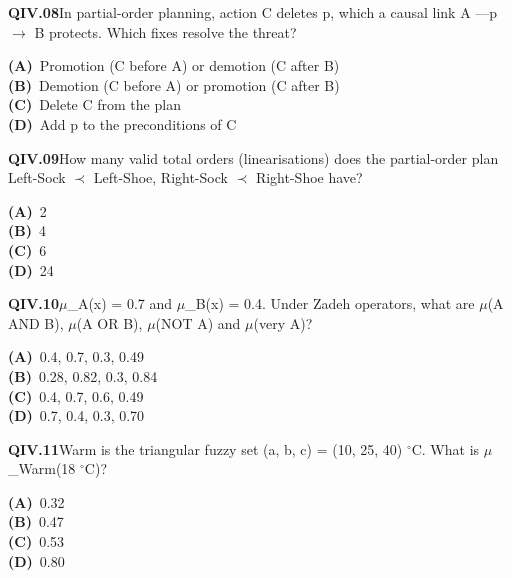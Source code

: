 \documentclass[11pt]{article}
\begin{document}
\begin{tcolorbox}[enhanced,breakable,colback=white,colframe=navyL,arc=2mm,boxrule=0.7pt,left=3mm,right=3mm,top=2mm,bottom=2mm]
\textbf{\color{navy}QIV.08}\quad In partial-order planning, action C deletes p, which a causal link A ---p$\to$ B protects. Which fixes resolve the threat?\hfill{}\par\smallskip
{\small \textbf{\color{navyL}(A)}\ Promotion (C before A) or demotion (C after B)\\[1pt]\textbf{\color{navyL}(B)}\ Demotion (C before A) or promotion (C after B)\\[1pt]\textbf{\color{navyL}(C)}\ Delete C from the plan\\[1pt]\textbf{\color{navyL}(D)}\ Add p to the preconditions of C}
\end{tcolorbox}
\begin{tcolorbox}[enhanced,breakable,colback=white,colframe=navyL,arc=2mm,boxrule=0.7pt,left=3mm,right=3mm,top=2mm,bottom=2mm]
\textbf{\color{navy}QIV.09}\quad How many valid total orders (linearisations) does the partial-order plan Left-Sock $\prec$ Left-Shoe, Right-Sock $\prec$ Right-Shoe have?\hfill{}\par\smallskip
{\small \textbf{\color{navyL}(A)}\ 2\\[1pt]\textbf{\color{navyL}(B)}\ 4\\[1pt]\textbf{\color{navyL}(C)}\ 6\\[1pt]\textbf{\color{navyL}(D)}\ 24}
\end{tcolorbox}
\begin{tcolorbox}[enhanced,breakable,colback=white,colframe=navyL,arc=2mm,boxrule=0.7pt,left=3mm,right=3mm,top=2mm,bottom=2mm]
\textbf{\color{navy}QIV.10}\quad $\mu$\_A(x) = 0.7 and $\mu$\_B(x) = 0.4. Under Zadeh operators, what are $\mu$(A AND B), $\mu$(A OR B), $\mu$(NOT A) and $\mu$(very A)?\hfill{}\par\smallskip
{\small \textbf{\color{navyL}(A)}\ 0.4, 0.7, 0.3, 0.49\\[1pt]\textbf{\color{navyL}(B)}\ 0.28, 0.82, 0.3, 0.84\\[1pt]\textbf{\color{navyL}(C)}\ 0.4, 0.7, 0.6, 0.49\\[1pt]\textbf{\color{navyL}(D)}\ 0.7, 0.4, 0.3, 0.70}
\end{tcolorbox}
\begin{tcolorbox}[enhanced,breakable,colback=white,colframe=navyL,arc=2mm,boxrule=0.7pt,left=3mm,right=3mm,top=2mm,bottom=2mm]
\textbf{\color{navy}QIV.11}\quad Warm is the triangular fuzzy set (a, b, c) = (10, 25, 40) $^\circ$C. What is $\mu$\_Warm(18 $^\circ$C)?\hfill{}\par\smallskip
{\small \textbf{\color{navyL}(A)}\ 0.32\\[1pt]\textbf{\color{navyL}(B)}\ 0.47\\[1pt]\textbf{\color{navyL}(C)}\ 0.53\\[1pt]\textbf{\color{navyL}(D)}\ 0.80}
\end{tcolorbox}
\end{document}
